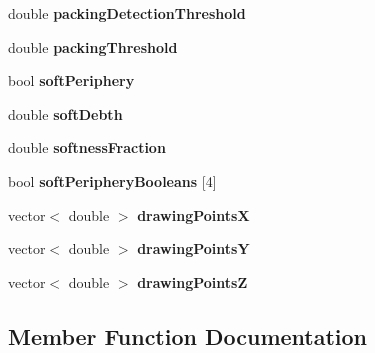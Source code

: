 \begin{DoxyCompactItemize}
\item 
\hypertarget{classSimulation_ab83a9bfa83ac45f58129afb916a129ce}{}double {\bfseries packing\+Detection\+Threshold}\label{classSimulation_ab83a9bfa83ac45f58129afb916a129ce}

\item 
\hypertarget{classSimulation_afa0e72518548c938a0c4974e432f9d83}{}double {\bfseries packing\+Threshold}\label{classSimulation_afa0e72518548c938a0c4974e432f9d83}

\item 
\hypertarget{classSimulation_af0e6096603f734ee31fbd898f94bf38b}{}bool {\bfseries soft\+Periphery}\label{classSimulation_af0e6096603f734ee31fbd898f94bf38b}

\item 
\hypertarget{classSimulation_a403dde59a46a182b8a6d012531c68371}{}double {\bfseries soft\+Debth}\label{classSimulation_a403dde59a46a182b8a6d012531c68371}

\item 
\hypertarget{classSimulation_a13ef7df1104c1e1263f50f11f36f3cdf}{}double {\bfseries softness\+Fraction}\label{classSimulation_a13ef7df1104c1e1263f50f11f36f3cdf}

\item 
\hypertarget{classSimulation_a939ae561258603220a73e00ad4143def}{}bool {\bfseries soft\+Periphery\+Booleans} \mbox{[}4\mbox{]}\label{classSimulation_a939ae561258603220a73e00ad4143def}

\item 
\hypertarget{classSimulation_ae986cf7cbc4969b97ab9762de559f393}{}vector$<$ double $>$ {\bfseries drawing\+Points\+X}\label{classSimulation_ae986cf7cbc4969b97ab9762de559f393}

\item 
\hypertarget{classSimulation_afb3f52f99073f709cafaf2d6ffec5eec}{}vector$<$ double $>$ {\bfseries drawing\+Points\+Y}\label{classSimulation_afb3f52f99073f709cafaf2d6ffec5eec}

\item 
\hypertarget{classSimulation_a951b693c08bee480c087a56ffac940dc}{}vector$<$ double $>$ {\bfseries drawing\+Points\+Z}\label{classSimulation_a951b693c08bee480c087a56ffac940dc}

\end{DoxyCompactItemize}


\subsection{Member Function Documentation}
\hypertarget{classSimulation_a51cb5448f660eeefc54a5d2a33ab561e}{}
